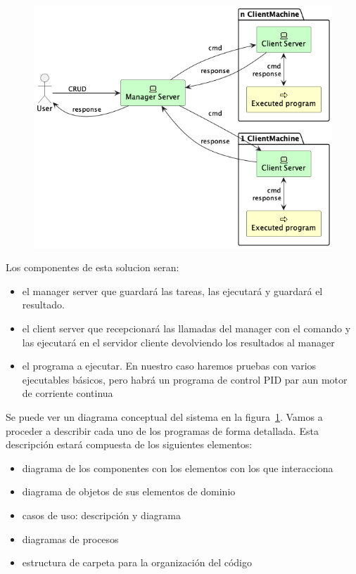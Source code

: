 
\begin{figure}[H]
    \centering
    \includegraphics[height=0.4\textheight]{./part/Proyecto_ejecutivo/memoria_descriptiva/descripcionDelProyecto/manager/uml/systemConcept}
    \caption[]{}\label{fig:systemConcept}
\end{figure}

Los componentes de esta solucion seran:
\begin{itemize}
    \item el manager server que guardará las tareas, las ejecutará y guardará el resultado.
    \item el client server que recepcionará las llamadas del manager con el comando y las ejecutará en el servidor cliente devolviendo los resultados al manager
    \item el programa a ejecutar. En nuestro caso haremos pruebas con varios ejecutables básicos, pero habrá un programa de control PID par aun motor de corriente continua
\end{itemize}

Se puede ver un diagrama conceptual del sistema en la figura~\ref{fig:systemConcept}. Vamos a proceder a describir cada uno de los programas de forma detallada. Esta descripción estará compuesta de los siguientes elementos:

\begin{itemize}
    \item diagrama de los componentes con los elementos con los que interacciona
    \item diagrama de objetos de sus elementos de dominio
    \item casos de uso: descripción y diagrama
    \item diagramas de procesos
    \item estructura de carpeta para la organización del código
\end{itemize}


